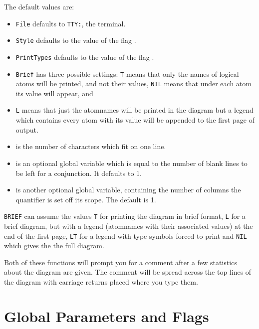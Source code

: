 The default values are:
\begin{itemize}
\item {\tt File} defaults to {\tt TTY:}, the terminal.

\item {\tt Style} defaults to the value of the flag .

\item {\tt PrintTypes} defaults to the value of the flag .

\item {\tt Brief} has three possible settings: {\tt T} means that only the names of logical atoms will be printed, 
	and not their values, {\tt NIL} means that under each atom its value will appear, and
\item {\tt L} means that just the atomnames will be printed in the diagram
	but a legend which contains every atom with its value will be 
	appended to the first page of output.

\item {} is the number of characters which fit on one line.

\item {} is an optional global variable
	which is equal to the number of
	blank lines to be left for a conjunction. It defaults
	to 1. 

\item {} is another optional global variable, containing the number
	of columns the quantifier is set off its scope. The default is 1.

\end{itemize}

{\tt BRIEF} can assume the values	{\tt T} for printing the diagram in brief 
format,	{\tt L} for a  brief diagram, but with a legend (atomnames with their
associated values) at the end of the first page, {\tt LT} for a legend with
type symbols forced to print and {\tt NIL} which gives the the full diagram.

Both of these functions will prompt you for a comment after a few statistics
about the diagram are given. The comment will
be spread across the top lines of the diagram with carriage returns placed
where you type them. 

\section{Global Parameters and Flags} \label{printflag}%

